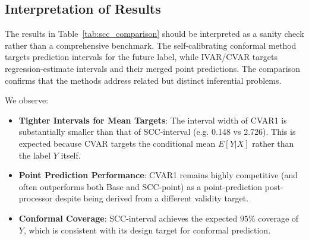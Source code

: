 \documentclass{article}
\begin{document}
\subsection{Interpretation of Results}

The results in Table~\ref{tab:scc_comparison} should be interpreted as a sanity check rather than a comprehensive benchmark. The self-calibrating conformal method targets prediction intervals for the future label, while IVAR/CVAR targets regression-estimate intervals and their merged point predictions. The comparison confirms that the methods address related but distinct inferential problems.

We observe:
\begin{itemize}
    \item \textbf{Tighter Intervals for Mean Targets}: The interval width of CVAR1 is substantially smaller than that of SCC-interval (e.g. 0.148 vs 2.726). This is expected because CVAR targets the conditional mean $E[Y|X]$ rather than the label $Y$ itself.
    \item \textbf{Point Prediction Performance}: CVAR1 remains highly competitive (and often outperforms both Base and SCC-point) as a point-prediction post-processor despite being derived from a different validity target.
    \item \textbf{Conformal Coverage}: SCC-interval achieves the expected $95\%$ coverage of $Y$, which is consistent with its design target for conformal prediction.
\end{itemize}
\end{document}
